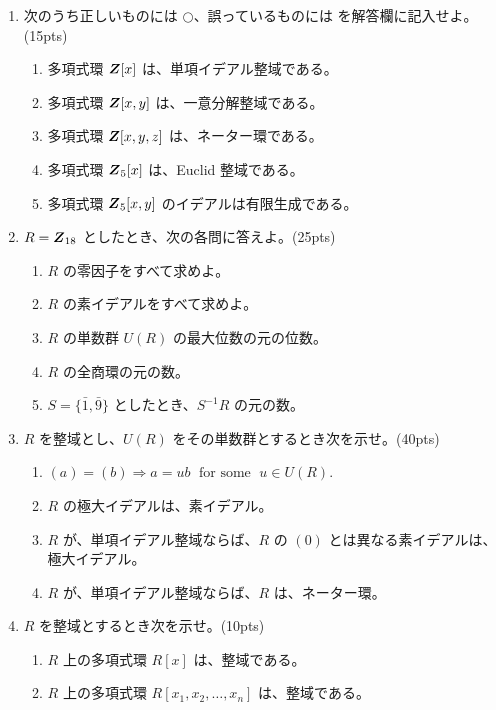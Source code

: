 \begin{enumerate}
\item 次のうち正しいものには $\bigcirc$、誤っているものには \bigx を解答欄に記入せよ。(15pts)
     \begin{enumerate}
     \item 多項式環 $\mbox{\boldmath $Z$}[x]$ は、単項イデアル整域である。
     \item 多項式環 $\mbox{\boldmath $Z$}[x,y]$ は、一意分解整域である。
     \item 多項式環 $\mbox{\boldmath $Z$}[x,y,z]$ は、ネーター環である。
     \item 多項式環 $\mbox{\boldmath $Z$}_5[x]$ は、Euclid 整域である。
     \item 多項式環 $\mbox{\boldmath $Z$}_5[x,y]$ のイデアルは有限生成である。
     \end{enumerate}
     
\item $R = \mbox{\boldmath $Z$}_{18}$ としたとき、次の各問に答えよ。(25pts)
     \begin{enumerate}
     \item $R$ の零因子をすべて求めよ。 
     \item $R$ の素イデアルをすべて求めよ。
     \item $R$ の単数群 $U(R)$ の最大位数の元の位数。
     \item $R$ の全商環の元の数。
     \item $S = \{\bar{1},\bar{9}\}$ としたとき、$S^{-1}R$ の元の数。
     \end{enumerate}

\item $R$ を整域とし、$U(R)$ をその単数群とするとき次を示せ。(40pts)
     \begin{enumerate}
     \item $(a) = (b) \Rightarrow a = ub \;\mbox{ for some }\;u\in U(R)$.
     \item $R$ の極大イデアルは、素イデアル。
     \item $R$ が、単項イデアル整域ならば、$R$ の $(0)$ とは異なる素イデアルは、極大イデアル。
     \item $R$ が、単項イデアル整域ならば、$R$ は、ネーター環。
     \end{enumerate}
     
\item $R$ を整域とするとき次を示せ。(10pts)
     \begin{enumerate}
     \item $R$ 上の多項式環 $R[x]$ は、整域である。
     \item $R$ 上の多項式環 $R[x_1, x_2, \ldots, x_n]$ は、整域である。
     \end{enumerate}
     

\end{enumerate}
